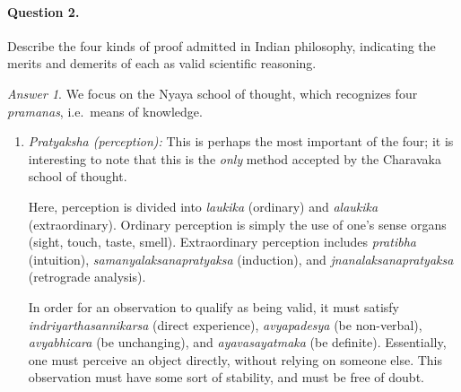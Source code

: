 \documentclass[11pt]{article}
\theoremstyle{remark}
\newtheorem*{answer}{Answer}
\begin{document}
    \paragraph{Question 2.} Describe the four kinds of proof admitted in Indian
    philosophy, indicating the merits and demerits of each as valid scientific
    reasoning.

    \begin{answer}
        We focus on the Nyaya school of thought, which recognizes four
        \textit{pramanas}, i.e.\ means of knowledge.

        \begin{enumerate}
            \item \textit{Pratyaksha (perception):} This is perhaps the most
            important of the four; it is interesting to note that this is the
            \emph{only} method accepted by the Charavaka school of thought.

            Here, perception is divided into \emph{laukika} (ordinary) and
            \emph{alaukika} (extraordinary). Ordinary perception is simply the use of
            one's sense organs (sight, touch, taste, smell). Extraordinary perception
            includes \emph{pratibha} (intuition), \emph{samanyalaksanapratyaksa}
            (induction), and \emph{jnanalaksanapratyaksa} (retrograde analysis).

            In order for an observation to qualify as being valid, it must satisfy
            \emph{indriyarthasannikarsa} (direct experience), \emph{avyapadesya} (be
            non-verbal), \emph{avyabhicara} (be unchanging), and
            \emph{ayavasayatmaka} (be definite). Essentially, one must perceive an
            object directly, without relying on someone else. This observation must
            have some sort of stability, and must be free of doubt.


\end{enumerate}
\end{answer}
\end{document}
